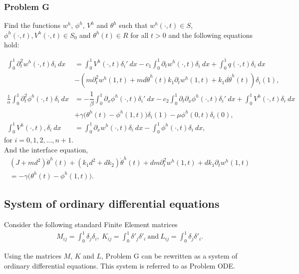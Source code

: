 \documentclass[../../main.tex]{subfiles}
\begin{document}
\subsubsection{Problem G}
Find the functions $w^h$, $\phi^h$, $V^h$ and $\theta^h$ such that $w^h(\cdot,t) \in S$,  $\phi^h(\cdot,t),V^h(\cdot,t) \in S_0$ and $\theta^h(t) \in R$ for all $t>0$ and the following equations hold:

\begin{align}
\int_0^1 \partial^2_t w^h(\cdot,t) \delta_i \ dx & =   \int_0^1 V^h(\cdot,t) \delta_i' \ dx - c_1 \int_0^1 \partial_t w^h(\cdot,t) \delta_i \ dx + \int_0^1 q(\cdot,t) \delta_i \ dx \nonumber \\
 & -(m \partial_t^2 w^h(1,t) +  md \ddot \theta^h(t)k_1 \partial_t w^h(1,t) + k_1 d \dot \theta^h(t))\delta_i(1), \\
\frac{1}{\alpha} \int_0^1 \partial^2_t \phi^h(\cdot,t) \delta_i \ dx & = -\dfrac{1}{\beta}\int_0^1\partial_x \phi^h(\cdot,t)\delta_i' \ dx - c_2 \int_0^1 \partial_t \partial_x \phi^h(\cdot,t) \delta_i' \ dx + \int_0^1 V^h(\cdot,t) \delta_i \ dx \nonumber \\
 & +\gamma \big(\theta^h(t) - \phi^h(1,t)\big)\delta_i(1) - \mu \phi^h(0,t)\delta_i(0),\\
\int_0^1 V^h(\cdot,t),\delta_i \ dx &= \int_0^1 \partial_x w^h(\cdot,t) \delta_i \ dx -  \int_0^1 \phi^h(\cdot,t) \delta_i \ dx, 
\end{align}
for $i = 0,1,2,...,n+1$.\\

And the interface equation,
\begin{align}
(J+ md^2) \ddot \theta^h(t)+ (k_1 d^2 + d k_2) \dot \theta^h(t)  + dm \partial_t^2 w^h(1,t)
  + dk_1 \partial_t w^h(1,t) \nonumber\\
  =  -\gamma \big(\theta^h(t) - \phi^h(1,t)\big).
\end{align}

\subsection{System of ordinary differential equations}
Consider the following standard Finite Element matrices
\begin{align*}\label{ch6_eq10}
M_{ij} = \int_0^1 \delta_j \delta_i, ~K_{ij} = \int_0^1 \delta'_j\delta'_i ~\textrm{and} ~L_{ij} = \int_0^1 \delta_j\delta'_i.
\end{align*}

Using the matrices $M$, $K$ and $L$, Problem G can be rewritten as a system of ordinary differential equations. This system is referred to as Problem ODE.
\end{document}
